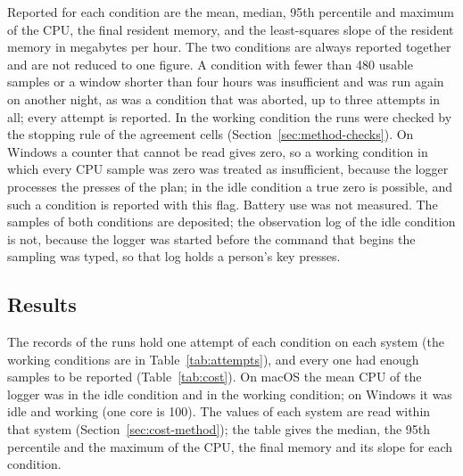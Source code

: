 Reported for each condition are the mean, median, 95th percentile and maximum of the CPU, the final resident memory,
and the least-squares slope of the resident memory in megabytes per hour. The two conditions are always reported
together and are not reduced to one figure. A condition with fewer than 480 usable samples or a window shorter than
four hours was insufficient and was run again on another night, as was a condition that was aborted, up to three
attempts in all; every attempt is reported. In the working condition the runs were checked by the stopping rule of the
agreement cells (Section~\ref{sec:method-checks}). On Windows a counter that cannot be read gives zero, so a working
condition in which every CPU sample was zero was treated as insufficient, because the logger processes the presses of
the plan; in the idle condition a true zero is possible, and such a condition is reported with this flag. Battery use
was not measured. The samples of both conditions are deposited; the observation log of the idle condition is not,
because the logger was started before the command that begins the sampling was typed, so that log holds a person's
key presses.

\subsection{Results}
\label{sec:cost-results}

The records of the runs hold one attempt of each condition on each system (the working conditions are in
Table~\ref{tab:attempts}), and every one had enough samples to be reported (Table~\ref{tab:cost}). On macOS the mean CPU of the
logger was  in the idle condition and  in the working
condition; on Windows it was  idle and  working (one core
is 100). The values of each system are read within that system (Section~\ref{sec:cost-method}); the table gives the
median, the 95th percentile and the maximum of the CPU, the final memory and its slope for each condition.


